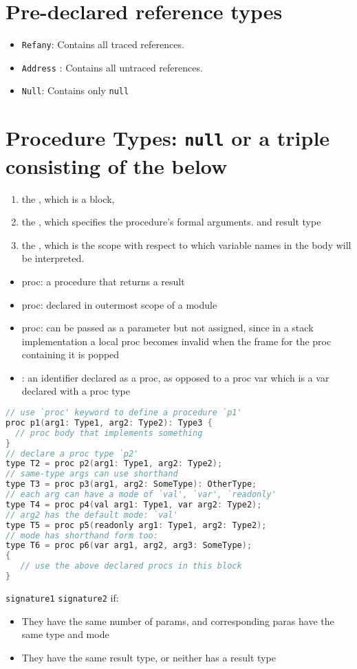 \documentclass[10pt,a4paper,landscape]{article}
\begin{document}
\begin{multicols*}{3}
\section*{Pre-declared reference types}
\begin{itemize}
\item \texttt{Refany}: Contains all traced references.
\item \texttt{Address} : Contains all untraced references.
\item \texttt{Null}: Contains only \texttt{null}
\end{itemize}
\section*{Procedure Types: \texttt{null} or a triple consisting of the below}
\begin{enumerate}
\item the , which is a block,
\item the , which specifies the procedure’s formal arguments. and result type
\item the , which is the scope with respect to which variable names in the body will be interpreted.
\end{enumerate}
\begin{itemize}
\item {} proc: a procedure that returns a result
\item {} proc: declared in outermost scope of a module
\item {} proc: can be passed as a parameter but not assigned, since in a stack implementation a local proc becomes invalid when the frame for the proc containing it is popped
\item {}: an identifier declared as a proc, as opposed to a proc var which is a var declared with a proc type
\end{itemize}
\begin{lstlisting}[language=c]
// use `proc' keyword to define a procedure `p1'
proc p1(arg1: Type1, arg2: Type2): Type3 {
  // proc body that implements something
}
// declare a proc type `p2'
type T2 = proc p2(arg1: Type1, arg2: Type2);
// same-type args can use shorthand
type T3 = proc p3(arg1, arg2: SomeType): OtherType;
// each arg can have a mode of `val', `var', `readonly'
type T4 = proc p4(val arg1: Type1, var arg2: Type2);
// arg2 has the default mode: `val'
type T5 = proc p5(readonly arg1: Type1, arg2: Type2);
// mode has shorthand form too:
type T6 = proc p6(var arg1, arg2, arg3: SomeType);
{
   // use the above declared procs in this block
}
\end{lstlisting}
\texttt{signature1}  \texttt{signature2} if:
\begin{itemize}
\item They have the same number of params, and corresponding paras have the same type and mode
\item They have the same result type, or neither has a result type
\end{itemize}

\end{multicols*}
\end{document}
